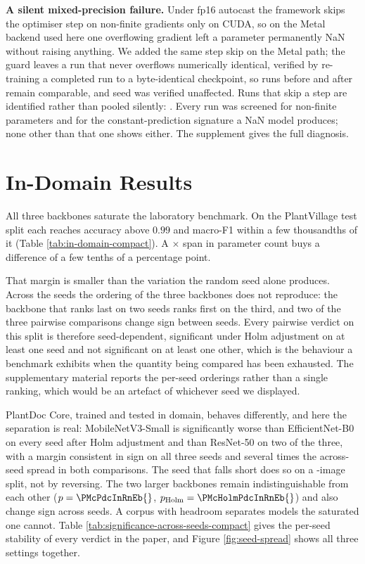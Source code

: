 \documentclass[runningheads]{llncs}
\begin{document}
\textbf{A silent mixed-precision failure.} Under fp16 autocast the framework
skips the optimiser step on non-finite gradients only on CUDA, so on the Metal
backend used here one overflowing gradient left a parameter permanently NaN
without raising anything. We added the same step skip on the Metal path; the
guard leaves a run that never overflows numerically identical, verified by
re-training a completed run to a byte-identical checkpoint, so runs before and
after remain comparable, and seed \SigSeed{} was verified unaffected. Runs that
skip a step are identified rather than pooled silently: \SkippedStepsNote{}.
Every run was screened for non-finite parameters and for the constant-prediction
signature a NaN model produces; none other than that one shows either. The
supplement gives the full diagnosis.

\section{In-Domain Results}
\label{sec:indomain}

All three backbones saturate the laboratory benchmark. On the PlantVillage test
split each reaches accuracy above $0.99$ and macro-F1 within a few thousandths
of it (Table \ref{tab:in-domain-compact}). A \ParamRatio{}$\times$ span in
parameter count buys a difference of a few tenths of a percentage point.



That margin is smaller than the variation the random seed alone produces. Across
the \NSeedsDone{} seeds the ordering of the three backbones does not reproduce:
the backbone that ranks last on two seeds ranks first on the third, and two of
the three pairwise comparisons change sign between seeds. Every pairwise verdict
on this split is therefore seed-dependent, significant under Holm adjustment on
at least one seed and not significant on at least one other, which is the
behaviour a benchmark exhibits when the quantity being compared has been
exhausted. The supplementary material reports the per-seed orderings rather than
a single ranking, which would be an artefact of whichever seed we displayed.

PlantDoc Core, trained and tested in domain, behaves differently, and here the
separation is real: MobileNetV3-Small is significantly worse than
EfficientNet-B0 on every seed after Holm adjustment and than ResNet-50 on two of
the three, with a margin consistent in sign on all three seeds and several times
the across-seed spread in both comparisons. The seed that falls short does so on
a \NPdcTest{}-image split, not by reversing. The two larger backbones remain
indistinguishable from each other ($p = \PMcPdcInRnEb{}$, $p_{\mathrm{Holm}} =
\PMcHolmPdcInRnEb{}$) and also change sign across seeds. A corpus with headroom
separates models the saturated one cannot. Table \ref{tab:significance-across-seeds-compact}
gives the per-seed stability of every verdict in the paper, and Figure
\ref{fig:seed-spread} shows all three settings together.
\end{document}

